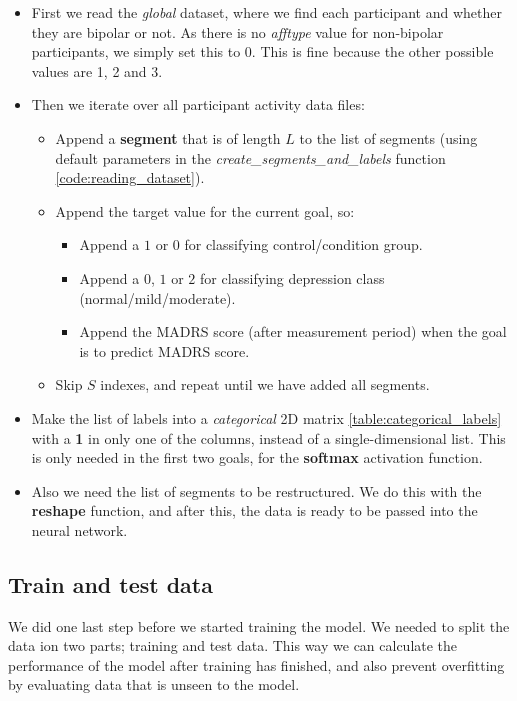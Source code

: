 \begin{itemize}
      \item First we read the \textit{global} dataset, where we find each participant and whether they are bipolar or not. As there is no \textit{afftype} value
            for non-bipolar participants, we simply set this to 0. This is fine because the other possible values are 1, 2 and 3.
      \item Then we iterate over all participant activity data files:

      \begin{itemize}
        \item Append a \textbf{segment} that is of length $L$ to the list of segments (using default parameters in the
              \textit{create\_segments\_and\_labels} function \ref{code:reading_dataset}).
        \item Append the target value for the current goal, so:
          \begin{itemize}
                \item Append a $1$ or $0$ for classifying control/condition group.
                \item Append a $0$, $1$ or $2$ for classifying depression class \\(normal/mild/moderate).
                \item Append the MADRS score (after measurement period) when the goal is to predict MADRS score.
          \end{itemize}  
        \item Skip $S$ indexes, and repeat until we have added all segments.
      \end{itemize}

      \item Make the list of labels into a \textit{categorical} 2D matrix \ref{table:categorical_labels} with a \textbf{1} in only one of the columns,
            instead of a single-dimensional list.
            This is only needed in the first two goals, for the \textbf{softmax} activation function.
      \item Also we need the list of segments to be restructured. We do this with the \textbf{reshape} function, 
            and after this, the data is ready to be passed into the neural network.
\end{itemize}

\subsection{Train and test data}
We did one last step before we started training the model. We needed to split the data ion two parts; training and test data. This way we can calculate the performance of the model after training has finished, and also prevent overfitting by evaluating data that is unseen to the model. 

